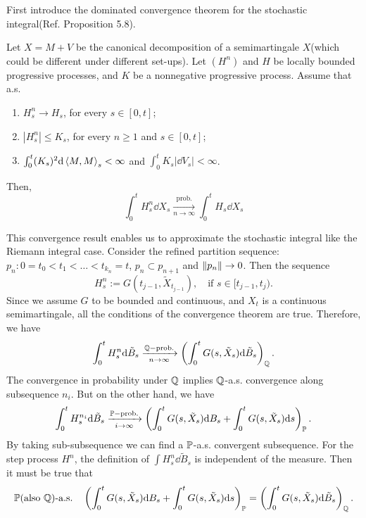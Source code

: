 \documentclass[8pt,onesided]{article}
\begin{document}
First introduce the dominated convergence theorem for the stochastic integral(Ref. \cite{gall2016brownian} Proposition 5.8).

\begin{theorem}
Let $X=M+V$ be the canonical decomposition of a semimartingale $X$(which could be different under different set-ups). Let $(H^n)$ and $H$ be locally bounded progressive processes, and $K$ be a nonnegative progressive process. Assume that a.s.
\begin{enumerate}
    \item $H^n_s\to H_s$, for every $s\in [0,t]$;
    \item $|H^n_s|\le K_s$, for every $n\ge 1$ and $s\in [0,t]$;
    \item $\int_0^t (K_s)^2\dd \left\langle M,M\right\rangle_s<\infty$ and $\int_0^t K_s|\dd V_s|<\infty$.
\end{enumerate}
Then, 
\begin{equation*}
    \int_0^t H_s^n \dd X_s \xrightarrow[n\to \infty]{\text{prob.}}\int_0^t H_s \dd X_s
\end{equation*} 
\end{theorem}

This convergence result enables us to approximate the stochastic integral like the Riemann integral case. Consider the refined partition sequence: $p_n:0=t_0<t_1<\dots<t_{k_n}=t$, $p_n\subset p_{n+1}$ and $\left\lVert p_n\right\rVert \to 0$. Then the sequence
\begin{equation*}
    H^n_s:= G(t_{j-1},\tilde X_{t_{j-1}}), \quad \text{if } s \in [t_{j-1},t_j).
\end{equation*}
Since we assume $G$ to be bounded and continuous, and $X_t$ is a continuous semimartingale, all the conditions of the convergence theorem are true. Therefore, we have
\begin{equation*}
    \int_0^t H^n_s \dd \tilde B_s\xrightarrow[n\to \infty]{\mathbb{Q}-\text{prob.}} \left(\int_0^t G(s,\tilde X_s) \dd \tilde{B}_s \right)_{\mathbb{Q}}.
\end{equation*}
The convergence in probability under $\mathbb{Q}$ implies $\mathbb{Q}$-a.s. convergence along subsequence $n_i$. But on the other hand, we have
\begin{equation*}
    \int_0^t H^{n_i}_s \dd \tilde B_s\xrightarrow[i\to \infty]{\mathbb{P}-\text{prob.}} \left(\int_0^t G(s,\tilde X_s) \dd B_s+ \int_0^t G(s,\tilde X_s) \dd s \right)_{\mathbb{P}}.
\end{equation*}
By taking sub-subsequence we can find a $\mathbb{P}$-a.s. convergent subsequence. For the step process $H^n$, the definition of $\int H^n_s \dd \tilde B_s$ is independent of the measure. Then it must be true that
\begin{equation*}
  \mathbb{P}\text{(also $\mathbb{Q}$)-a.s.} \quad  \left(\int_0^t G(s,\tilde X_s) \dd B_s+ \int_0^t G(s,\tilde X_s) \dd s \right)_{\mathbb{P}}=\left(\int_0^t G(s,\tilde X_s) \dd \tilde{B}_s \right)_{\mathbb{Q}}.
\end{equation*}



\end{document}
